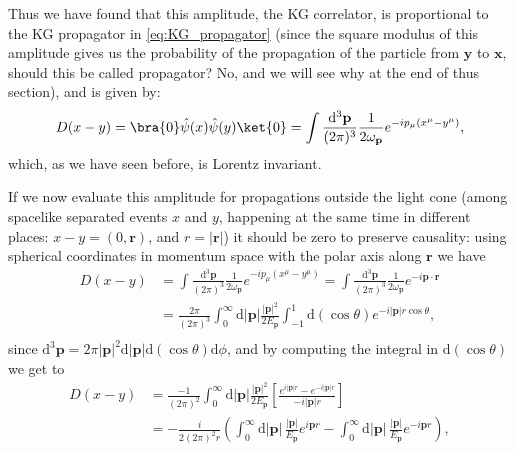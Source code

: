 Thus we have found that this amplitude, the KG correlator, is proportional to the KG propagator in \eqref{eq:KG_propagator} (since the square modulus of this amplitude gives us the probability of the propagation of the particle from \(\mathbf{y}\) to \(\mathbf{x}\), should this be called propagator? No, and we will see why at the end of thus section), and is given by:
\begin{equation}
    D(x-y) = \bra{0} \hat \psi (x) \hat \psi (y) \ket{0} = \int \frac{\mathrm{d}^3 \mathbf{p}}{(2\pi)^3} \frac{1}{2\omega_{\mathbf{p}}} e^{-i p_{\mu} (x^{\mu}-y^{\mu})},
    \label{eq:KG_correlator}
\end{equation}
which, as we have seen before, is Lorentz invariant.

If we now evaluate this amplitude for propagations outside the light cone (among spacelike separated events \(x\) and \(y\), happening at the same time in different places: \(x-y = (0, \mathbf{r})\), and \(r = \vert \mathbf{r} \vert\)) it should be zero to preserve causality: using spherical coordinates in momentum space with the polar axis along \(\mathbf{r}\) we have
\[
    \begin{aligned}
        D(x-y) & = \int \frac{\mathrm{d}^3 \mathbf{p}}{(2\pi)^3} \frac{1}{2\omega_{\mathbf{p}}} e^{-i p_{\mu} (x^{\mu}-y^{\mu})} = \int \frac{\mathrm{d}^3 \mathbf{p}}{(2\pi)^3} \frac{1}{2\omega_{\mathbf{p}}} e^{-i \mathbf{p} \cdot \mathbf{r}} \\
               & = \frac{2\pi}{(2\pi)^3} \int_0^{\infty} \mathrm{d} \vert \mathbf{p} \vert \frac{\vert \mathbf{p} \vert^2}{2E_{\mathbf{p}}} \int_{-1}^{1} \mathrm{d}(\cos \theta) e^{-i \vert \mathbf{p} \vert r \cos \theta},                     \\
    \end{aligned}
\]
since \(\mathrm{d}^3 \mathbf{p} = 2\pi \vert \mathbf{p} \vert^2 \mathrm{d} \vert \mathbf{p} \vert \mathrm{d}(\cos \theta) \mathrm{d}\phi\), and by computing the integral in \(\mathrm{d}(\cos \theta)\) we get to
\[
    \begin{aligned}
        D(x-y) & = \frac{-1}{(2\pi)^2} \int_0^{\infty} \mathrm{d} \vert \mathbf{p} \vert \frac{\vert \mathbf{p} \vert^2}{2E_{\mathbf{p}}} \left[\frac{e^{i \vert \mathbf{p} \vert r }-e^{-i \vert \mathbf{p} \vert r }}{-i \vert \mathbf{p} \vert r} \right]                                            \\
               & = -\frac{i}{2(2\pi)^2 r} \left( \int_0^{\infty} \mathrm{d} \vert \mathbf{p} \vert\, \frac{\vert \mathbf{p} \vert }{E_{\mathbf{p}} }e^{i \mathbf{p} r} - \int_0^{\infty} \mathrm{d} \vert \mathbf{p} \vert\, \frac{\vert \mathbf{p} \vert }{E_{\mathbf{p}}}e^{-i \mathbf{p} r} \right),
    \end{aligned}
\]
